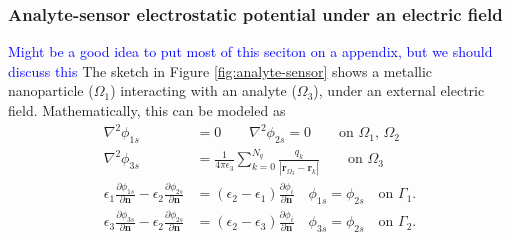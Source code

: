 

%



\subsubsection{Analyte-sensor electrostatic potential under an electric field}

\textcolor{blue}{Might be a good idea to put most of this seciton on a appendix, but we should discuss this}
The sketch in Figure \ref{fig:analyte-sensor} shows a metallic nanoparticle ($\Omega_1$) interacting with an analyte ($\Omega_3$), under an external electric field.
Mathematically, this can be modeled as
%
\begin{align} \label{eq:electrostatic_scatter_prot_sen}
\nabla^2 \phi_{1s} &= 0 \qquad \nabla^2 \phi_{2s} = 0 \qquad\text{on $\Omega_1$, $\Omega_2$} \nonumber\\
\nabla^2 \phi_{3s} &= \frac{1}{4\pi\epsilon_3} \sum_{k=0}^{N_q} \frac{q_k}{|\mathbf{r}_{\Omega_3} - \mathbf{r}_k|} \qquad\text{on $\Omega_3$} \nonumber \\
\epsilon_1\frac{\partial\phi_{1s}}{\partial \mathbf{n}} - \epsilon_2\frac{\partial\phi_{2s}}{\partial\mathbf{n}} &= (\epsilon_2-\epsilon_1)\frac{\partial\phi_i}{\partial\mathbf{n}} \quad \phi_{1s} = \phi_{2s} \quad \text{on $\Gamma_1$}. \nonumber\\
\epsilon_3\frac{\partial\phi_{3s}}{\partial \mathbf{n}} - \epsilon_2\frac{\partial\phi_{2s}}{\partial\mathbf{n}} &= (\epsilon_2-\epsilon_3)\frac{\partial\phi_i}{\partial\mathbf{n}} \quad \phi_{3s} = \phi_{2s} \quad \text{on $\Gamma_2$}.
\end{align}
%

